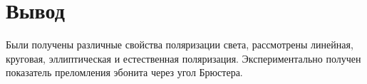 \documentclass[a4paper]{article}
\begin{document}
\section{Вывод}

Были получены различные свойства поляризации света, рассмотрены линейная, круговая, эллиптическая и естественная поляризация. Экспериментально получен показатель преломления эбонита через угол Брюстера.\\
\end{document}
